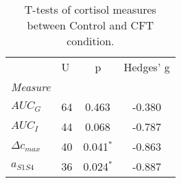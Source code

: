 \begin{table}[h]
\centering
\caption{T-tests of cortisol measures between Control and CFT condition.}
\label{tab:tab_ttest_cortisol_measures}

\begin{tabular}{l||lSS}
\toprule
{} & {U} &          {p} & {Hedges' g} \\
\textit{Measure}          &     &              &             \\
\midrule
\textit{$AUC_{G}$}        &  64 &   0.463$^{}$ &      -0.380 \\
\textit{$AUC_{I}$}        &  44 &   0.068$^{}$ &      -0.787 \\
\textit{$\Delta c_{max}$} &  40 &  0.041$^{*}$ &      -0.863 \\
\textit{$a_{S1S4}$}       &  36 &  0.024$^{*}$ &      -0.887 \\
\bottomrule
\end{tabular}
\end{table}

